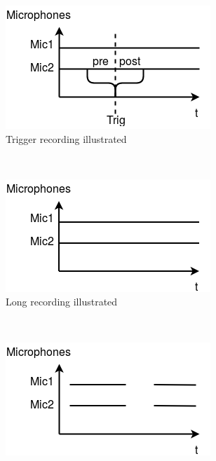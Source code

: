 \begin{figure}
    \centering
    \begin{subfigure}[b]{0.3\textwidth}
        \includegraphics[width=\textwidth]{figures/recording_trigger.png}
        \caption{Trigger recording illustrated}
        \label{fig:usecase:triggerrecording}
    \end{subfigure}
    ~ %
    \begin{subfigure}[b]{0.3\textwidth}
        \includegraphics[width=\textwidth]{figures/recording_long.png}
        \caption{Long recording illustrated}
        \label{fig:usecase:longrecording}
    \end{subfigure}
    ~ %
    \begin{subfigure}[b]{0.3\textwidth}
        \includegraphics[width=\textwidth]{figures/recording_short.png}

\end{subfigure}
\end{figure}
